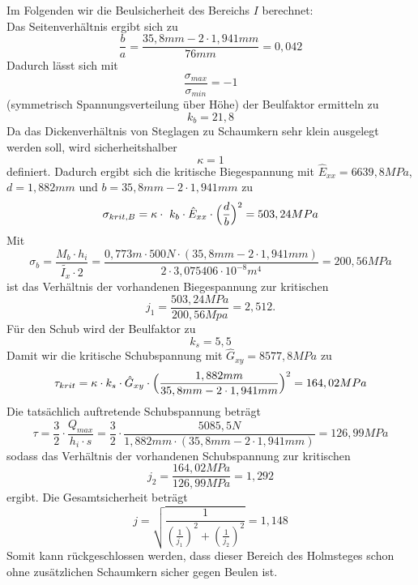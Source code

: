 \noindent Im Folgenden wir die Beulsicherheit des Bereichs $I$ berechnet:\\
\noindent Das Seitenverhältnis ergibt sich zu 
\begin{equation}
	\frac{b}{a}=\frac{35,8 mm-2\cdot 1,941 mm}{76 mm}=0,042
\end{equation}
Dadurch lässt sich mit 
\begin{equation}
	\frac{\sigma_{max}}{\sigma_{min}}=-1
\end{equation}
(symmetrisch Spannungsverteilung über Höhe) der Beulfaktor ermitteln zu
\begin{equation}
	k_{b} = 21,8
\end{equation}
Da das Dickenverhältnis von Steglagen zu Schaumkern sehr klein ausgelegt werden soll, wird sicherheitshalber
\begin{equation}
	\kappa = 1
\end{equation}
definiert. Dadurch ergibt sich die kritische Biegespannung mit $\hat{E}_{xx}=6639,8MPa$, $d=1,882mm$ und $b=35,8mm-2\cdot 1,941mm$ zu
\begin{equation}
	\sigma_{krit,B}=\kappa\cdot\ k_{b}\cdot \hat{E}_{xx}\cdot\Bigl(\frac{d}{b}\Bigr)^{2}=503,24MPa
\end{equation}
Mit
\begin{equation}
	\sigma_{b}=\frac{M_{b}\cdot {h_{i}}}{\tilde{I_{x}}\cdot 2}=\frac{0,773m\cdot500N\cdot (35,8mm - 2\cdot 1,941mm)}{2\cdot 3,075406\cdot 10^{-8} m^{4} }=200,56 MPa
\end{equation}
ist das Verhältnis der vorhandenen Biegespannung zur kritischen 
\begin{equation}
	j_{1}=\frac{503,24MPa}{200,56 Mpa}=2,512.
\end{equation}
 Für den Schub wird der Beulfaktor zu
\begin{equation}
	k_{s}=5,5
\end{equation}
Damit wir die kritische Schubspannung mit $\hat{G}_{xy}=8577,8MPa$ zu 
\begin{equation}
	\tau_{krit}=\kappa\cdot k_{s}\cdot \hat{G}_{xy}\cdot\Bigl(\frac{1,88 2mm}{35,8 mm - 2\cdot 1,941  mm}\Bigr)^{2}=164,02 MPa
\end{equation}
Die tatsächlich auftretende Schubspannung beträgt 
\begin{equation}
	\tau= \frac{3}{2}\cdot\frac{Q_{max}}{h_{i}\cdot s} =\frac{3}{2}\cdot \frac{5085,5 N}{1,882 mm\cdot(35,8 mm-2\cdot 1,941 mm)}=126,99 MPa
\end{equation}
sodass das Verhältnis der vorhandenen Schubspannung zur kritischen 
\begin{equation}
	j_{2}=\frac{164,02 MPa}{126,99 MPa}= 1,292
\end{equation}
ergibt. Die Gesamtsicherheit beträgt
\begin{equation}
	j=\sqrt{\frac{1}{\left(\frac{1}{j_{1}}\right)^{2}+\left(\frac{1}{j_{2}}\right)^{2}}}=1,148
\end{equation}
Somit kann rückgeschlossen werden, dass dieser Bereich des Holmsteges schon ohne zusätzlichen Schaumkern sicher gegen Beulen ist.\\

